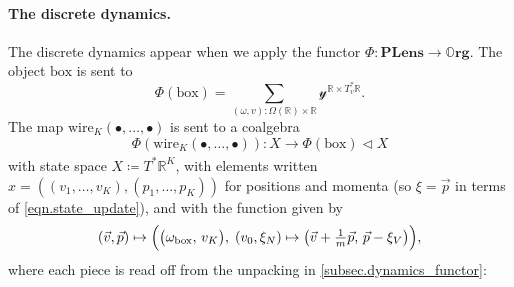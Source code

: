 \documentclass[11pt, oneside, article]{memoir}
\theoremstyle{definition}
\theoremstyle{plain}
\newcommand{\Cat}[1]{\mathbf{#1}}%
\newcommand{\fun}[1]{\mathrm{#1}}%
\newcommand{\To}[2][]{\xrightarrow[#1]{#2}}
\newcommand{\rr}{\mathbb{R}}
\newcommand{\yon}{\mathcal{y}}
\newcommand{\tri}{\mathbin{\triangleleft}}
\newcommand{\org}{{\mathbb{O}\Cat{rg}}}
\newcommand{\Part}{\bullet}
\newcommand{\boxob}{\mathrm{box}}
\newcommand{\potlens}{\Cat{PLens}}
\begin{document}
\paragraph{The discrete dynamics.}

The discrete dynamics appear when we apply the functor $\Phi\colon\potlens\to\org$. The object $\boxob$ is sent to
\[
\Phi(\boxob)=\sum_{(\omega,v):\Omega(\rr)\times\rr}\yon^{\rr\times T^*_v\rr}.
\]
The map $\fun{wire}_K(\Part,\ldots,\Part)$ is sent to a coalgebra
\[
\Phi(\fun{wire}_K(\Part,\ldots,\Part))\colon X\To{}\Phi(\boxob)\tri X
\]
with state space $X\coloneqq T^*\rr^K$, with elements written $x=((v_1,\ldots,v_K),(p_1,\ldots,p_K))$ for positions and momenta (so $\xi=\vec p$ in terms of \eqref{eqn.state_update}), and with the function given by
\begin{equation}\label{eqn.wave_coalg}
(\vec v,\vec p)\mapsto\Bigl(\bigl(\omega_\boxob,\,v_K\bigr),\;(v_0,\xi_N)\mapsto\bigl(\vec v+\tfrac{1}{m}\vec p,\,\vec p-\xi_V\bigr)\Bigr),
\end{equation}
where each piece is read off from the unpacking in \cref{subsec.dynamics_functor}:
\end{document}
